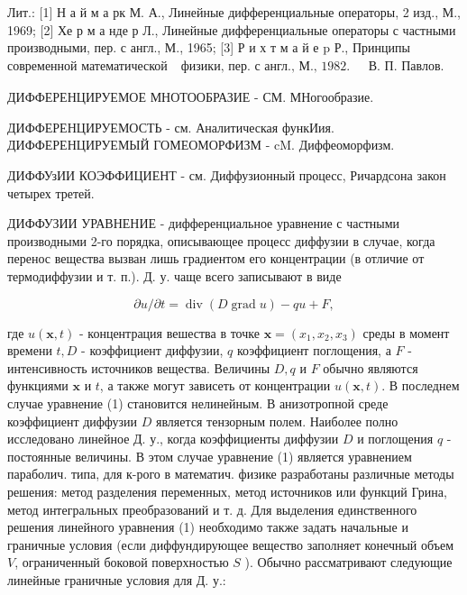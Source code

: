 \documentclass[10pt]{article}
\begin{document}
Лит.: [1] Н а й м а рк М. А., Линейные дифференциальные операторы, 2 изд., М., 1969; [2] Хе р м а нде р Л., Линейные дифференциальные операторы с частными производными, пер. с англ., М., 1965; [3] Р и х т м а й е p Р., Принципы современной математической $\begin{array}{ll}\text { физики, пер. с англ., М., 1982. } & \text { В. П. Павлов. }\end{array}$



ДИФФЕРЕНЦИРУЕМОЕ МНОТООБРАЗИЕ - СМ. МНогообразие.



ДИФФЕРЕНЦИРУЕМОСТЬ - см. Аналитическая функИия. ДИФФЕРЕНЦИРУЕМЫЙ ГОМЕОМОРФИЗМ - $\mathrm{cM}$. Диффеоморфизм.



ДИФФУзИИ КОЭФФИЦИЕНТ - см. Диффузионный процесс, Ричардсона закон четырех третей.



ДИФФУЗИИ УРАВНЕНИЕ - дифференциальное уравнение с частными производными 2-го порядка, описывающее процесс диффузии в случае, когда перенос вещества вызван лишь градиентом его концентрации (в отличие от термодиффузии и т. п.). Д. у. чаще всего записывают в виде



\[

\partial u / \partial t=\operatorname{div}(D \operatorname{grad} u)-q u+F,

\]



где $u(\boldsymbol{x}, t)$ - концентрация вешества в точке $\boldsymbol{x}=\left(x_{1}, x_{2}, x_{3}\right)$ среды в момент времени $t, D$ - коэффициент диффузии, $q$ коэффициент поглощения, а $F$ - интенсивность источников вещества. Величины $D, q$ и $F$ обычно являются функциями $\boldsymbol{x}$ и $t$, а также могут зависеть от концентрации $u(\boldsymbol{x}, t)$. В последнем случае уравнение (1) становится нелинейным. В анизотропной среде коэффициент диффузии $D$ является тензорным полем. Наиболее полно исследовано линейное Д. у., когда коэффициенты диффузии $D$ и поглощения $q$ - постоянные величины. В этом случае уравнение (1) является уравнением параболич. типа, для к-рого в математич. физике разработаны различные методы решения: метод разделения переменных, метод источников или функций Грина, метод интегральных преобразований и т. д. Для выделения единственного решения линейного уравнения (1) необходимо также задать начальные и граничные условия (если диффундирующее вещество заполняет конечный объем $V$, ограниченный боковой поверхностью $S$ ). Обычно рассматривают следующие линейные граничные условия для Д. у.:
\end{document}
